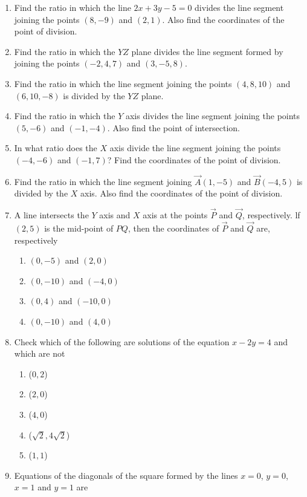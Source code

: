 \begin{enumerate}[label=\thesubsection.\arabic*, ref=\thesubsection.\theenumi]
\item Find the ratio in which the line $2x+3y-5=0$ divides the line segment joining the points $(8,-9)$ and $(2,1)$. Also find the coordinates of the point of division.
\item Find the ratio in which the $YZ$ plane divides the line segment formed by joining the points $(-2,4,7)$ and $(3,-5,8)$.
\item Find the ratio in which the line segment joining the points $(4,8,10)$ and $(6,10,-8)$ is divided by the $YZ$ plane.
\item Find the ratio in which the $Y$ axis divides the line segment joining the points $(5,-6)$ and $(-1,-4)$. Also find the point of intersection.
\item In what ratio does the $X$ axis divide the line segment joining the points $(-4,-6)$ and $(-1,7)$? Find the coordinates of the point of division.
\item Find the ratio in which the line segment joining $\vec{A}(1,-5)$  and  $\vec{B}(-4,5)$ is divided by the $X$ axis. Also find the coordinates of the point of division.
\item A line intersects the $Y$ axis and $X$ axis at the points $\vec{P}$  and $\vec{Q}$,  respectively. lf $(2, 5)$ is the mid-point of $PQ$,  then the coordinates of $\vec{P}$ and $ \vec{Q}$ are,  respectively
\begin{enumerate}
	\item$(0,-5)$ and $(2,0)$
	\item$(0,-10)$ and $(-4,0)$
	\item$(0,4)$ and  $(-10,0)$
	\item$(0,-10)$ and $(4,0)$
\end{enumerate}
\item Check which of the following are solutions of the equation $x-2y=4$ and which 
are not
\begin{enumerate}
\item ($0, 2$)
\item ($2, 0$)
\item ($4, 0$)
\item ($\sqrt 2,  4\sqrt 2$)
\item ($1, 1$)
\end{enumerate}
\item Equations of the diagonals of the square formed by the lines $x=0$,  $y=0$,  $x=1$ and $y=1$ are

\end{enumerate}

